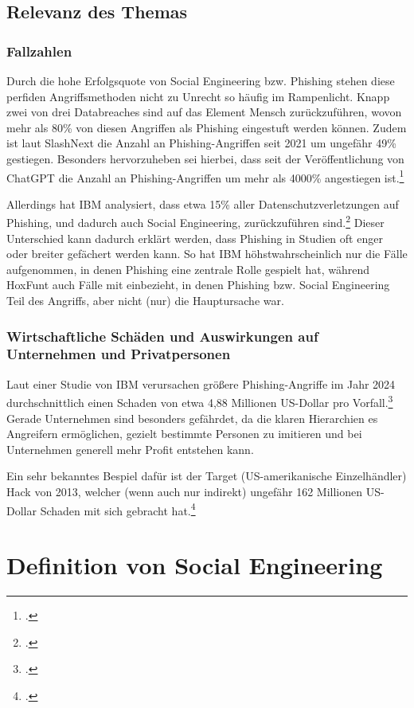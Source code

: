 \documentclass[12pt, a4paper, oneside]{scrartcl}
\begin{document}
\subsection{Relevanz des Themas}

\subsubsection{Fallzahlen}
Durch die hohe Erfolgsquote von Social Engineering bzw. Phishing stehen diese perfiden 
Angriffsmethoden nicht zu Unrecht so häufig im Rampenlicht. Knapp zwei von drei 
Databreaches sind auf das Element Mensch zurückzuführen, wovon mehr als 80\% von diesen Angriffen
als Phishing eingestuft werden können. Zudem ist laut SlashNext die Anzahl an Phishing-Angriffen
seit 2021 um ungefähr 49\% gestiegen. Besonders hervorzuheben sei hierbei, dass seit der Veröffentlichung
von ChatGPT die Anzahl an Phishing-Angriffen um mehr als 4000\% angestiegen ist.\footcite{HoxHunt_Report}
\par
Allerdings hat IBM analysiert, dass etwa 15\% aller Datenschutzverletzungen auf Phishing, und
dadurch auch Social Engineering, zurückzuführen sind.\footcite{IBM_Report}
Dieser Unterschied kann dadurch erklärt werden, dass Phishing in Studien oft enger oder breiter 
gefächert werden kann. So hat IBM höhstwahrscheinlich nur die Fälle aufgenommen, in denen 
Phishing eine zentrale Rolle gespielt hat, während HoxFunt auch Fälle mit einbezieht,
in denen Phishing bzw. Social Engineering Teil des Angriffs, aber nicht (nur) die Hauptursache war.

\subsubsection{Wirtschaftliche Schäden und Auswirkungen auf Unternehmen und Privatpersonen}
Laut einer Studie von IBM verursachen größere Phishing-Angriffe im Jahr 2024 durchschnittlich 
einen Schaden von etwa 4,88 Millionen US-Dollar pro Vorfall.\footcite{IBM_Phishing}
Gerade Unternehmen sind besonders gefährdet, da die klaren Hierarchien es Angreifern ermöglichen, 
gezielt bestimmte Personen zu imitieren und bei Unternehmen generell mehr Profit entstehen kann.
\par
Ein sehr bekanntes Bespiel dafür ist der Target (US-amerikanische Einzelhändler) Hack von 2013,
welcher (wenn auch nur indirekt) ungefähr 162 Millionen US-Dollar Schaden mit sich gebracht hat.\footcite{Target_Breach}\\

\section{Definition von Social Engineering}
\end{document}
